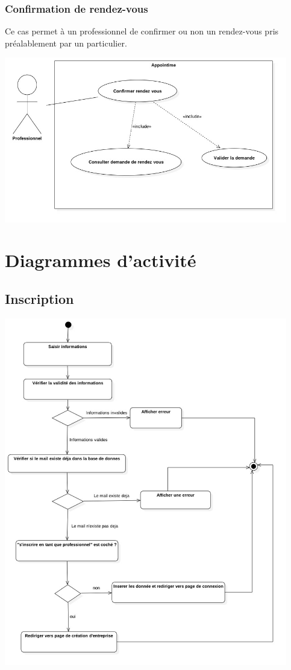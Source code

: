\documentclass{article}
\begin{document}
\subsubsection{Confirmation de rendez-vous}
Ce cas permet à un professionnel de confirmer ou non un rendez-vous pris préalablement par un particulier.
\begin{center}
  \includegraphics[width=350pt]{diagram/useCaseConfirmerDemande}
\end{center}
\section{Diagrammes d'activité}
\subsection{Inscription}
\begin{center}
  \includegraphics[width=350pt]{diagram/activiteInscription}
\end{center}
\end{document}
